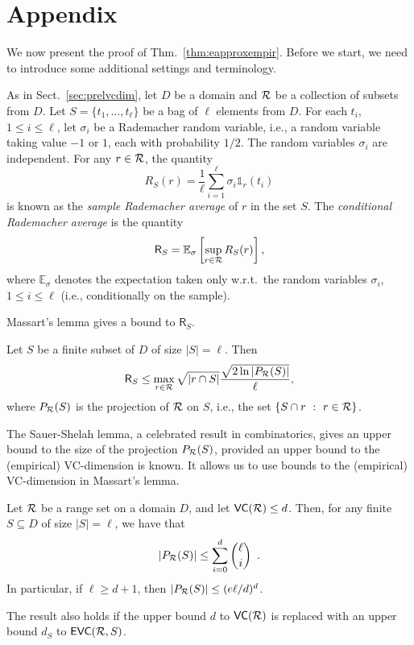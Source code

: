 \appendix
\section{Appendix}
We now present the proof of Thm.~\ref{thm:eapproxempir}. Before we start, we
need to introduce some additional settings and terminology.

As in Sect.~\ref{sec:prelvcdim}, let $D$ be a domain and $\mathcal{R}$ be a
collection of subsets from $D$. Let $S=\{t_1,\dotsc,t_\ell\}$ be a bag of $\ell$
elements from $D$. For each $t_i$, $1\le i\le \ell$, let $\sigma_i$ be a
Rademacher random variable, i.e., a random variable taking value $-1$ or $1$,
each with probability $1/2$. The random variables $\sigma_i$ are independent.
For any $r\in\mathcal{R}$, the quantity
\[
	R_S(r)=\frac{1}{\ell}\sum_{i=1}^\ell \sigma_i\mathds{1}_r(t_i)
\]
is known as the \emph{sample Rademacher average} of $r$ in the set $S$. The
\emph{conditional Rademacher average} is the quantity
\[
	\mathsf{R}_S=\mathbb{E}_\sigma\left[\sup_{r\in\mathcal{R}}R_S(r)\right],
\]
where $\mathbb{E}_\sigma$ denotes the expectation taken only w.r.t.~the random
variables $\sigma_i$, $1\le i\le\ell$ (i.e., conditionally on the sample).

Massart's lemma gives a bound to $\mathsf{R}_S$.
\begin{lemma}\label{lem:massart}
	Let $S$ be a finite subset of $D$ of size $|S|=\ell$. Then
	\[
		\mathsf{R}_S\le\max_{r\in\mathcal{R}}\sqrt{|r\cap S|}\frac{\sqrt{2\ln
		|P_{\mathcal{R}}(S)|}}{\ell},
	\]
	where $P_{\mathcal{R}}(S)$ is the projection of $\mathcal{R}$ on $S$, i.e., the set
	$\{S\cap r ~:~ r\in\mathcal{R}\}$.
\end{lemma}

The Sauer-Shelah lemma, a celebrated result in combinatorics, gives an upper
bound to the size of the projection $P_{\mathcal{R}}(S)$, provided an upper bound to
the (empirical) VC-dimension is known. It allows us to use bounds to the
(empirical) VC-dimension in Massart's lemma.
\begin{lemma}\label{lem:sauer}
	Let $\mathcal{R}$ be a range set on a domain $D$, and let $\mathsf{VC}(\mathcal{R})\le d$.
	Then, for any finite $S\subseteq D$ of size $|S|=\ell$, we have that
	\[
		|P_{\mathcal{R}}(S)|\le \sum_{i=0}^d\binom{\ell}{i}\enspace.
	\]
	In particular, if $\ell\ge d+1$, then $|P_{\mathcal{R}}(S)|\le (e\ell/d)^d$.

	The result also holds if the upper bound $d$ to $\mathsf{VC}(\mathcal{R})$ is replaced with
	an upper bound $d_S$ to $\mathsf{EVC}(\mathcal{R},S)$.
\end{lemma}

